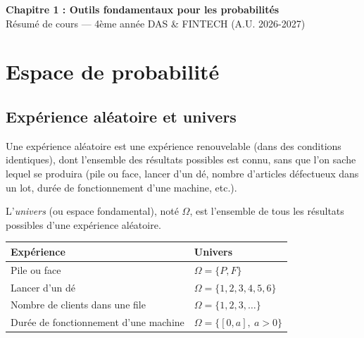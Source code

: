 \documentclass[11pt,a4paper]{article}
\newcommand{\1}{\mathbf{1}}
\begin{document}
\begin{center}
{\LARGE\bfseries Chapitre 1 : Outils fondamentaux pour les probabilités}\\[6pt]
{\large Résumé de cours --- 4ème année DAS \& FINTECH (A.U. 2026-2027)}
\end{center}
\vspace{2pt}
\tableofcontents
\vspace{4pt}

\section{Espace de probabilité}

\subsection{Expérience aléatoire et univers}

\begin{definition}
Une expérience aléatoire est une expérience renouvelable (dans des conditions identiques), dont l'ensemble des résultats possibles est connu, sans que l'on sache lequel se produira (pile ou face, lancer d'un dé, nombre d'articles défectueux dans un lot, durée de fonctionnement d'une machine, etc.).
\end{definition}

\begin{definition}[Univers]
L'\emph{univers} (ou espace fondamental), noté $\Omega$, est l'ensemble de tous les résultats possibles d'une expérience aléatoire.
\end{definition}

\begin{center}
\begin{tabular}{ll}
\toprule
\textbf{Expérience} & \textbf{Univers}\\
\midrule
Pile ou face & $\Omega=\{P,F\}$\\
Lancer d'un dé & $\Omega=\{1,2,3,4,5,6\}$\\
Nombre de clients dans une file & $\Omega=\{1,2,3,\dots\}$\\
Durée de fonctionnement d'une machine & $\Omega=\{[0,a],\ a>0\}$\\
\bottomrule
\end{tabular}
\end{center}
\end{document}
